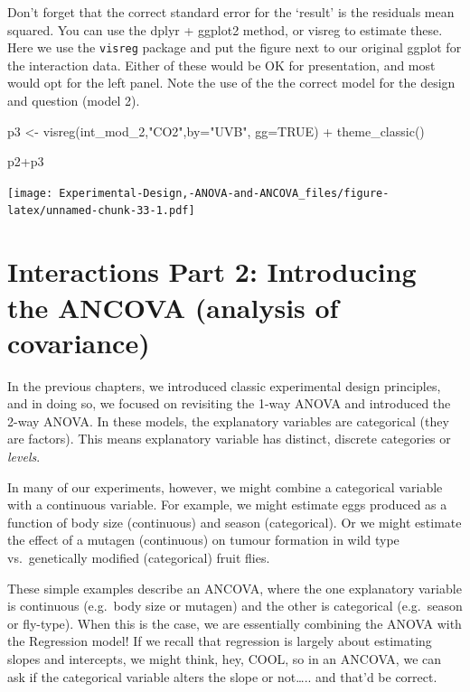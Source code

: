 \documentclass[
]{book}
\newenvironment{Shaded}{\begin{snugshade}}{\end{snugshade}}
\newcommand{\AttributeTok}[1]{\textcolor[rgb]{0.77,0.63,0.00}{#1}}
\newcommand{\ConstantTok}[1]{\textcolor[rgb]{0.00,0.00,0.00}{#1}}
\newcommand{\FunctionTok}[1]{\textcolor[rgb]{0.00,0.00,0.00}{#1}}
\newcommand{\NormalTok}[1]{#1}
\newcommand{\OtherTok}[1]{\textcolor[rgb]{0.56,0.35,0.01}{#1}}
\newcommand{\SpecialCharTok}[1]{\textcolor[rgb]{0.00,0.00,0.00}{#1}}
\newcommand{\StringTok}[1]{\textcolor[rgb]{0.31,0.60,0.02}{#1}}
\begin{document}
Don't forget that the correct standard error for the `result' is the residuals mean squared. You can use the dplyr + ggplot2 method, or visreg to estimate these. Here we use the \texttt{visreg} package and put the figure next to our original ggplot for the interaction data. Either of these would be OK for presentation, and most would opt for the left panel. Note the use of the the correct model for the design and question (model 2).

\begin{Shaded}
\begin{Highlighting}[]
\NormalTok{p3 }\OtherTok{\textless{}{-}} \FunctionTok{visreg}\NormalTok{(int\_mod\_2,}\StringTok{"CO2"}\NormalTok{,}\AttributeTok{by=}\StringTok{"UVB"}\NormalTok{, }\AttributeTok{gg=}\ConstantTok{TRUE}\NormalTok{) }\SpecialCharTok{+}
  \FunctionTok{theme\_classic}\NormalTok{()}

\NormalTok{p2}\SpecialCharTok{+}\NormalTok{p3}
\end{Highlighting}
\end{Shaded}

\texttt{[image: Experimental-Design,-ANOVA-and-ANCOVA\_files/figure-latex/unnamed-chunk-33-1.pdf]}

\hypertarget{interactions-part-2-introducing-the-ancova-analysis-of-covariance}{%
\chapter{Interactions Part 2: Introducing the ANCOVA (analysis of covariance)}\label{interactions-part-2-introducing-the-ancova-analysis-of-covariance}}

In the previous chapters, we introduced classic experimental design principles, and in doing so, we focused on revisiting the 1-way ANOVA and introduced the 2-way ANOVA. In these models, the explanatory variables are categorical (they are factors). This means explanatory variable has distinct, discrete categories or \emph{levels}.

In many of our experiments, however, we might combine a categorical variable with a continuous variable. For example, we might estimate eggs produced as a function of body size (continuous) and season (categorical). Or we might estimate the effect of a mutagen (continuous) on tumour formation in wild type vs.~genetically modified (categorical) fruit flies.

These simple examples describe an ANCOVA, where the one explanatory variable is continuous (e.g.~body size or mutagen) and the other is categorical (e.g.~season or fly-type). When this is the case, we are essentially combining the ANOVA with the Regression model! If we recall that regression is largely about estimating slopes and intercepts, we might think, hey, COOL, so in an ANCOVA, we can ask if the categorical variable alters the slope or not\ldots.. and that'd be correct.
\end{document}
